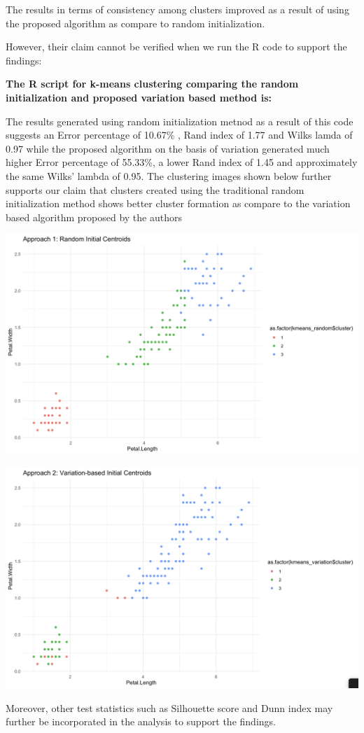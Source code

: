 \documentclass[12pt,letterpaper]{article}
\begin{document}
The results in terms of consistency among clusters improved as a result of using the proposed algorithm as compare to random initialization.

\vspace{.25cm}

However, their claim cannot be verified when we run the R code to support the findings:

\vspace{.35cm}

\textbf{		The R script for k-means clustering comparing the random initialization and proposed variation based method is:}


\vspace{.35cm}

The results generated using random initialization metnod as a result of this code suggests an Error percentage of 10.67\% , Rand index of 1.77 and Wilks lamda of 0.97 while the proposed algorithm on the basis of variation generated much higher Error percentage of 55.33\%, a lower Rand index of  1.45 and approximately the same  Wilks' lambda of 0.95.  The clustering images shown below further supports our claim that clusters created using the traditional random initialization method shows better cluster formation as compare to the variation based algorithm proposed by the authors

\vspace{.5cm}
\includegraphics[scale=0.35]{image5}


\vspace{.5cm}
\includegraphics[scale=0.35]{image6}

Moreover, other test statistics such as Silhouette score and Dunn index may further be incorporated in the analysis to support the findings.
\end{document}
